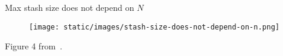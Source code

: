 \begin{frame}{Max stash size does not depend on $N$}
	
	\begin{center}

		\begin{figure}

			\texttt{[image: static/images/stash-size-does-not-depend-on-n.png]}

		\end{figure}

	\end{center}

	Figure 4 from~\cite{DBLP:journals/corr/abs-1202-5150}.

\end{frame}
